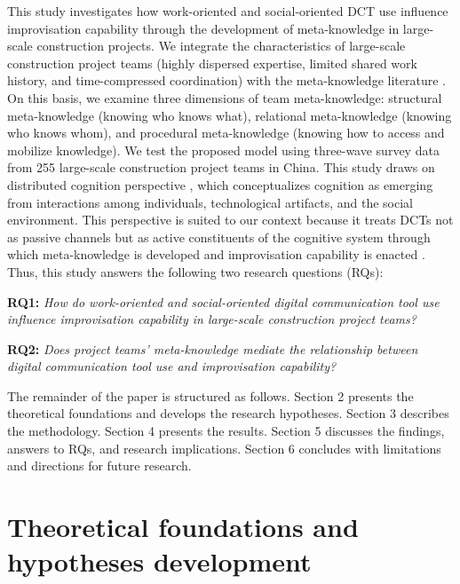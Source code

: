 \documentclass[authoryear,preprint,review,times,10pt]{elsarticle}
\begin{document}
This study investigates how work-oriented and social-oriented DCT use influence improvisation capability through the development of meta-knowledge in large-scale construction projects. We integrate the characteristics of large-scale construction project teams (highly dispersed expertise, limited shared work history, and time-compressed coordination) with the meta-knowledge literature \citep{wegner1987Transactive, leonardi2014Social}. On this basis, we examine three dimensions of team meta-knowledge: structural meta-knowledge (knowing who knows what), relational meta-knowledge (knowing who knows whom), and procedural meta-knowledge (knowing how to access and mobilize knowledge). We test the proposed model using three-wave survey data from 255 large-scale construction project teams in China. This study draws on distributed cognition perspective \citep{hutchins2020Distributed}, which conceptualizes cognition as emerging from interactions among individuals, technological artifacts, and the social environment. This perspective is suited to our context because it treats DCTs not as passive channels but as active constituents of the cognitive system through which meta-knowledge is developed and improvisation capability is enacted \citep{leonardi2015Ambient}. Thus, this study answers the following two research questions (RQs):

\textbf{RQ1:} \textit{How do work-oriented and social-oriented digital communication tool use influence improvisation capability in large-scale construction project teams?}

\textbf{RQ2:} \textit{Does project teams' meta-knowledge mediate the relationship between digital communication tool use and improvisation capability?}

The remainder of the paper is structured as follows. Section 2 presents the theoretical foundations and develops the research hypotheses. Section 3 describes the methodology. Section 4 presents the results. Section 5 discusses the findings, answers to RQs, and research implications. Section 6 concludes with limitations and directions for future research.

\section{Theoretical foundations and hypotheses development}
\end{document}
